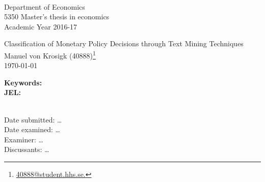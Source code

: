 
	\\
	Department of Economics\\
	5350 Master’s thesis in economics\\
	Academic Year 2016-17\\

	\vspace{1cm}	
	\begin{centering}
		\Large{Classification of Monetary Policy Decisions through Text Mining Techniques}\\
		\vspace{.5cm}	
		\large{Manuel von Krosigk (40888)}\footnote{\href{mailto:40888@student.hhs.se}{40888@student.hhs.se.}}\\
		\vspace{.5cm}	
		\large{\today}\\
	\end{centering}	
	\begin{abstract}
		\dots
	\end{abstract}
	\textbf{Keywords:}
	\\\textbf{JEL:}
	
	\vfill
	\\Date submitted: \dots
	\\Date examined: \dots
	\\Examiner: \dots
	\\Discussants: \dots